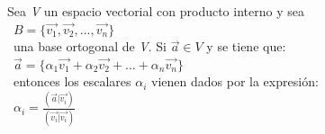 \documentclass[preview]{standalone}
\begin{document}
\begin{center}
Sea \textit{V} un espacio vectorial con producto interno y sea \\\ $B = \{\vec{v_1}, \vec{v_2}, ..., \vec{v_n}\}$ \\\ una base ortogonal de \textit{V}. Si $\vec{a} \in V$ y se tiene que:\\\ $\vec{a} = \{\alpha_1 \vec{v_1} + \alpha_2 \vec{v_2} + ... + \alpha_n \vec{v_n} \}$ \\\ entonces los escalares $\alpha_i$ vienen dados por la expresión: \\\ $\alpha_i = \frac{(\vec{a} | \vec{v_i})}{(\vec{v_i} | \vec{v_i})} $
\end{center}
\end{document}
